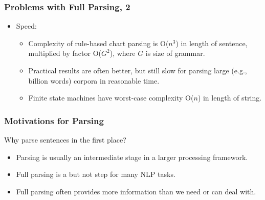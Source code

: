 \begin{frame}[fragile]
  \frametitle{Problems with Full Parsing, 2}

  \begin{itemize}
 
    \item Speed:
      \begin{itemize}
      \item Complexity of rule-based chart parsing is O($n^3$) in length
        of sentence, multiplied by factor O($G^2$), where $G$ is size
        of grammar.
      \item Practical results are often better, but still slow for
        parsing large (e.g., billion words) corpora in reasonable
        time.
      \item Finite state machines have worst-case complexity O($n$) in
        length of string.
      \end{itemize}
  \end{itemize}

\end{frame}





\begin{frame}[fragile]
  \frametitle{Motivations for Parsing}

Why parse sentences in the first place?
  \begin{itemize}
    \item Parsing is usually an intermediate stage in a larger
      processing framework.
    \item Full parsing is a  but not 
      step for many NLP tasks.
    \item Full parsing often provides more information than we need or
      can deal with.
  \end{itemize}

\end{frame}

